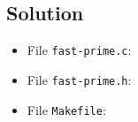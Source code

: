 \documentclass[12pt,letterpaper,twoside]{article}
\begin{document}
\newpage

\subsection*{Solution}

\lstset{language=c,tabsize=4}
\begin{itemize}
\item[] File \texttt{fast-prime.c}:

\item[] File \texttt{fast-prime.h}:

\lstset{language=[gnu]make,tabsize=4}
\item[] File \texttt{Makefile}:

\end{itemize}
\end{document}
